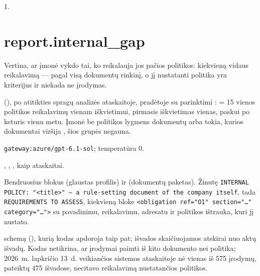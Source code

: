  1.


\section{report.internal\_gap}\label{sec:aprompts:report-internal_gap}

 Vertina, ar įmonė vykdo tai, ko reikalauja jos pačios politikos:
kiekvieną vidaus reikalavimą --- pagal visą dokumentų rinkinį, o jį nustatanti politika yra
kriterijus ir niekada ne įrodymas.

  (), po atitikties spragų
analizės ataskaitoje, pradėtoje su parinktimi :  = 15 vienos
politikos reikalavimų vienam iškvietimui, pirmasis iškvietimas vienas, paskui po keturis vienu
metu. Įmonė be politikos lygmens dokumentų arba tokia, kurios dokumentai viršija
, šios grupės negauna.

 \texttt{gateway:azure/gpt-6.1-sol}; temperatūra 0.

 , , , kaip
ataskaitai.

 Bendruosius blokus  (glaustas profilis) ir
 (dokumentų paketas). Žinutę \texttt{INTERNAL POLICY: "<title>" — a rule-setting document of the company itself}, tada \texttt{REQUIREMENTS TO ASSESS}, kiekvieną bloke
\texttt{<obligation ref="O1" section="…" category="…">} su pavadinimu, reikalavimu, adresatu ir
politikos ištrauka, kuri jį nustato.

  schemą (),
kurią kodas apdoroja taip pat; išvados skaičiuojamos atskirai nuo aktų išvadų. Kodas netikrina,
ar įrodymai paimti iš kito dokumento nei politika; 2026~m. lapkričio 13~d. veikiančios sistemos
ataskaitoje nė vienas iš 575 įrodymų, pateiktų 475 išvadose, necitavo reikalavimą nustatančios
politikos.

